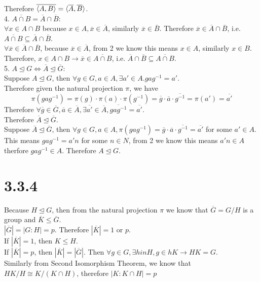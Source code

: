 \documentclass{article}
\begin{document}
Therefore $\overline{\braket{A, B}} = \braket{\overline{A}, \overline{B}}$.\\
4. $\overline{A \cap B} = \overline{A} \cap \overline{B}$:\\
$\forall x \in A \cap B$ because $x \in A, \overline{x} \in \overline{A}$, similarly $\overline{x} \in \overline{B}$. Therefore $\overline{x} \in \overline{A} \cap \overline{B}$, i.e. $\overline{A \cap B} \subseteq \overline{A} \cap \overline{B}$.\\
$\forall \overline{x} \in \overline{A} \cap \overline{B}$, because $\overline{x} \in \overline{A}$, from 2 we know this means $x \in A$, similarly $x \in B$. Therefore, $x \in A \cap B \rightarrow \overline{x} \in \overline{A \cap B}$, i.e. $\overline{A} \cap \overline{B} \subseteq \overline{A \cap B}$.\\
5. $A \trianglelefteq G \iff \overline{A} \trianglelefteq \overline{G}$:\\
Suppose $A \trianglelefteq G$, then $\forall g \in G, a \in A, \exists a' \in A. gag^{-1} = a'$.\\
Therefore given the natural projection $\pi$, we have
\begin{equation*}
    \pi(gag^{-1}) = \pi(g)\cdot\pi(a)\cdot\pi(g^{-1}) = \overline{g}\cdot\overline{a}\cdot\overline{g^{-1}} = \pi(a') = \overline{a'}
\end{equation*}
Therefore $\forall \overline{g} \in \overline{G}, \overline{a} \in \overline{A}, \exists \overline{a'} \in \overline{A}, \overline{gag^{-1}} = \overline{a'}$.\\
Therefore $\overline{A} \trianglelefteq \overline{G}$.\\
Suppose $\overline{A} \trianglelefteq \overline{G}$, then $\forall g \in G, a \in A, \pi(gag^{-1}) = \overline{g} \cdot \overline{a} \cdot \overline{g^{-1}} = \overline{a'}$ for some $a' \in A$.\\
This means $gag^{-1} = a'n$ for some $n \in N$, from 2 we know this means $a'n \in A$ therfore $gag^{-1} \in A$. Therefore $A \trianglelefteq G$.
\section{3.3.4}
Because $H \trianglelefteq G$, then from the natural projection $\pi$ we know that $\overline{G} = G/H$ is a group and $\overline{K} \leq \overline{G}$.\\
$|\overline{G}| = |G:H| = p$. Therefore $|\overline{K}| = 1$ or $p$.\\
If $|\overline{K}| = 1$, then $K \leq H$.\\
If $|\overline{K}| = p$, then $|\overline{K}| = |\overline{G}|$. Then $\forall g \in G, \exists h 
in H, g \in hK \rightarrow HK = G$.\\
Similarly from Second Isomorphism Theorem, we know that $HK/H \cong K/(K \cap H)$, therefore $|K:K\cap H| = p$
\end{document}
